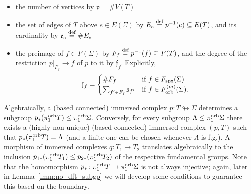 \documentclass{amsart}
\newcommand{\defeq}{\stackrel{\tn{def}}{=}}
\newcommand{\Fspx}{F_{\textnormal{spx}}}
\newcommand{\Forb}[1][m]{F^{(#1)}_{\textnormal{orb}}}
\newcommand{\pio}{\pi_1^{\textnormal{orb}}}
\newcommand{\tn}{\textnormal}
\begin{document}
\begin{itemize}
\item the number of vertices by $\mathfrak{v}=\#V(T)$
\item the set of edges of $T$ above $e\in E(\Sigma)$ by $E_e\defeq p^{-1}(e)\subseteq E(T)$, and its cardinality by $\mathfrak{e}_e\defeq\#E_e$
\item the preimage of $f\in F(\Sigma)$ by $F_f\defeq p^{-1}(f)\subseteq F(T)$, and the degree of the restriction $p|_{F_f}\to f$ of $p$ to it by $\mathfrak{f}_f$. Explicitly,
\begin{equation*}
\mathfrak{f}_f=\begin{cases}\#F_f&\text{if }f\in \Fspx(\Sigma)\\\sum_{f'\in F_f}\mathfrak{s}_{f'}&\text{if }f\in\Forb(\Sigma).\end{cases}
\end{equation*}
\end{itemize}

Algebraically, a (based connected) immersed complex $p\colon T\looparrowright\Sigma$ determines a subgroup $p_*(\pio T)\le\pio\Sigma$. Conversely, for every subgroup $\Lambda\le\pio\Sigma$ there exists a (highly non-unique) (based connected) immersed complex $(p,T)$ such that $p_*(\pio T)=\Lambda$ (and a finite one can be chosen whenever $\Lambda$ is f.g.). A morphism of immersed complexes $q\colon T_1\to T_2$ translates algebraically to the inclusion $p_{1*}(\pio T_1)\le p_{2*}(\pio T_2)$ of the respective fundamental groups. Note that the homomorphism $p_*\colon\pio T\to\pio\Sigma$ is not always injective; again, later in Lemma~\ref{lmm:no_dft_subgp} we will develop some conditions to guarantee this based on the boundary.

\medskip
\end{document}
